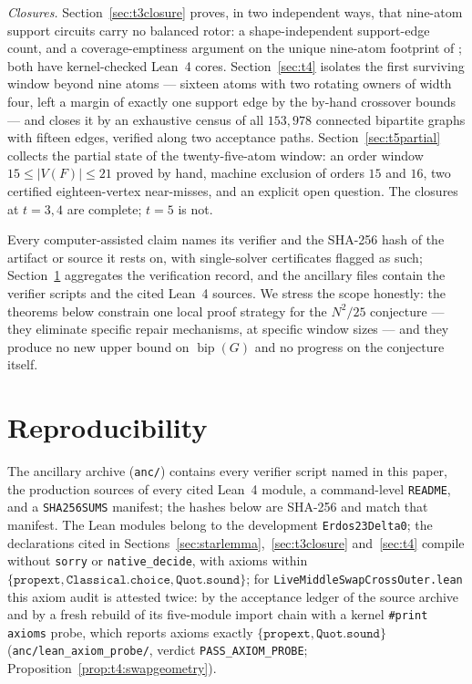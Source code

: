 \documentclass[11pt]{article}
\theoremstyle{definition}
\newcommand{\bip}{\operatorname{bip}}
\begin{document}
\emph{Closures.} Section~\ref{sec:t3closure} proves, in two
independent ways, that nine-atom support circuits carry no balanced
rotor: a shape-independent support-edge count, and a coverage-emptiness
argument on the unique nine-atom footprint of
\cite{Ferudun26supports}; both have kernel-checked Lean~4 cores.
Section~\ref{sec:t4} isolates the first surviving window beyond nine
atoms --- sixteen atoms with two rotating owners of width four, left a
margin of exactly one support edge by the by-hand crossover bounds ---
and closes it by an exhaustive census of all \(153{,}978\) connected
bipartite graphs with fifteen edges, verified along two acceptance
paths. Section~\ref{sec:t5partial} collects the partial state of the
twenty-five-atom window: an order window \(15\le|V(F)|\le21\) proved by
hand, machine exclusion of orders \(15\) and \(16\), two certified
eighteen-vertex near-misses, and an explicit open question. The
closures at \(t=3,4\) are complete; \(t=5\) is not.

Every computer-assisted claim names its verifier and the SHA-256 hash
of the artifact or source it rests on, with single-solver certificates
flagged as such; Section~\ref{sec:repro} aggregates the verification
record, and the ancillary files contain the verifier scripts and the
cited Lean~4 sources. We stress the scope honestly: the theorems below
constrain one local proof strategy for the \(N^2/25\) conjecture ---
they eliminate specific repair mechanisms, at specific window sizes ---
and they produce no new upper bound on \(\bip(G)\) and no progress on
the conjecture itself.













\section{Reproducibility}\label{sec:repro}

The ancillary archive (\texttt{anc/}) contains every verifier script
named in this paper, the production sources of every cited Lean~4
module, a command-level \texttt{README}, and a \texttt{SHA256SUMS}
manifest; the hashes below are SHA-256 and match that manifest. The
Lean modules belong to the development \texttt{Erdos23Delta0}; the
declarations cited in
Sections~\ref{sec:starlemma},~\ref{sec:t3closure} and~\ref{sec:t4}
compile without \texttt{sorry} or \texttt{native\_decide}, with axioms
within \(\{\texttt{propext},\texttt{Classical.choice},
\texttt{Quot.sound}\}\); for \texttt{LiveMiddleSwapCrossOuter.lean}
this axiom audit is attested twice: by the acceptance ledger of the
source archive and by a fresh rebuild of its five-module import chain
with a kernel \texttt{\#print axioms} probe, which reports axioms
exactly \(\{\texttt{propext},\texttt{Quot.sound}\}\)
(\texttt{anc/lean\_axiom\_probe/}, verdict \texttt{PASS\_AXIOM\_PROBE};
Proposition~\ref{prop:t4:swapgeometry}).
\end{document}
